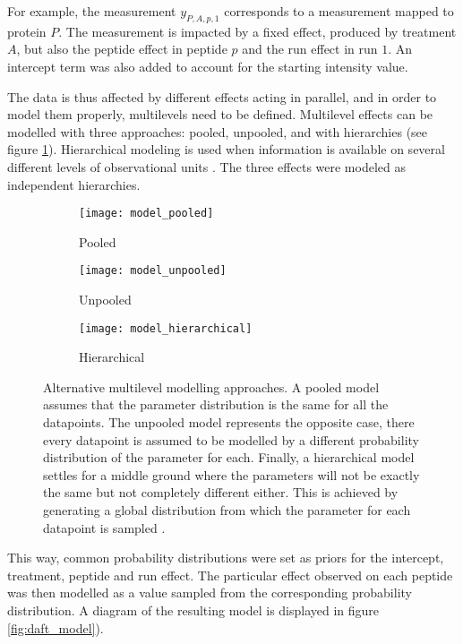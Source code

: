 For example, the measurement $y_{P,A,p,1}$ corresponds to a measurement mapped to protein $P$. The measurement is impacted by a fixed effect, produced by treatment $A$, but also the peptide effect in peptide $p$ and the run effect in run $1$. An intercept term was also added to account for the starting intensity value.

The data is thus affected by different effects acting in parallel, and in order to model them properly, multilevels need to be defined. Multilevel effects can be modelled with three approaches: pooled, unpooled, and with hierarchies (see figure \ref{fig:multilevel}). Hierarchical modeling is used when information is available on several different levels of observational units \cite{gelman2013bayesian}. The three effects were modeled as independent hierarchies.

\begin{figure}[!h]
\centering
\begin{subfigure}{.9\textwidth}
\centering
\caption*{Pooled}
\texttt{[image: model\_pooled]}
\end{subfigure}
\bigskip
\begin{subfigure}{.9\textwidth}
\centering
\caption*{Unpooled}
\texttt{[image: model\_unpooled]}
\end{subfigure}
\bigskip
\begin{subfigure}{.9\textwidth}
\centering
\caption*{Hierarchical}
\texttt{[image: model\_hierarchical]}
\end{subfigure}
\caption[]{Alternative multilevel modelling approaches. A pooled model assumes that the parameter distribution is the same for all the datapoints.  The unpooled model represents the opposite case, there every datapoint is assumed to be modelled by a different probability distribution of the parameter for each. Finally, a hierarchical model settles for a middle ground where the parameters will not be exactly the same but not completely different either. This is achieved by generating a global distribution from which the parameter for each datapoint is sampled \footnotemark{}.}
\label{fig:multilevel}
\end{figure}



This way, common probability distributions were set as priors for the intercept, treatment, peptide and run effect. The particular effect observed on each peptide was then modelled as a value sampled from the corresponding probability distribution. A diagram of the resulting model is displayed in figure \ref{fig:daft_model}).

